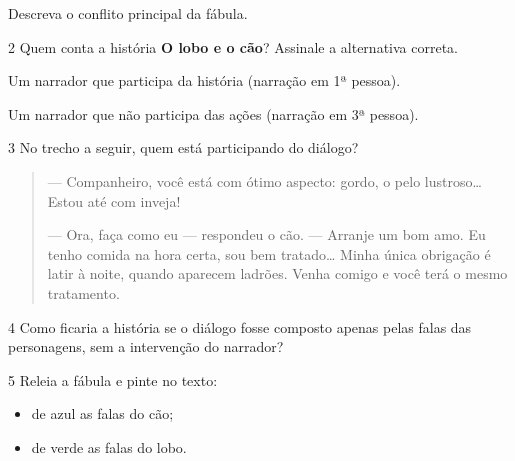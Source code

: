 \begin{escolha}
\begin{escolha}
\begin{escolha}
\begin{escolha}
\item Descreva o conflito principal da fábula.

\end{escolha}

\num{2} Quem conta a história \textbf{O lobo e o cão}? Assinale a alternativa correta.

\begin{boxlist}
\boxitem[] Um narrador que participa da história (narração em 1ª pessoa).

\boxitem[\rosa{X}] Um narrador que não participa das ações (narração em 3ª pessoa).
\end{boxlist}

\num{3} No trecho a seguir, quem está participando do diálogo?

\begin{quote}
--- Companheiro, você está com ótimo aspecto: gordo, o pelo
lustroso\ldots{} Estou até com inveja!

--- Ora, faça como eu --- respondeu o cão. --- Arranje um bom amo. Eu
tenho comida na hora certa, sou bem tratado\ldots{} Minha única
obrigação é latir à noite, quando aparecem ladrões. Venha comigo e você
terá o mesmo tratamento.
\end{quote}


\num{4} Como ficaria a história se o diálogo fosse composto apenas pelas falas
das personagens, sem a intervenção do narrador?



\num{5} Releia a fábula e pinte no texto:

\begin{itemize}
\item de azul as falas do cão;

\item de verde as falas do lobo.
\end{itemize}


\end{escolha}
\end{escolha}
\end{escolha}
